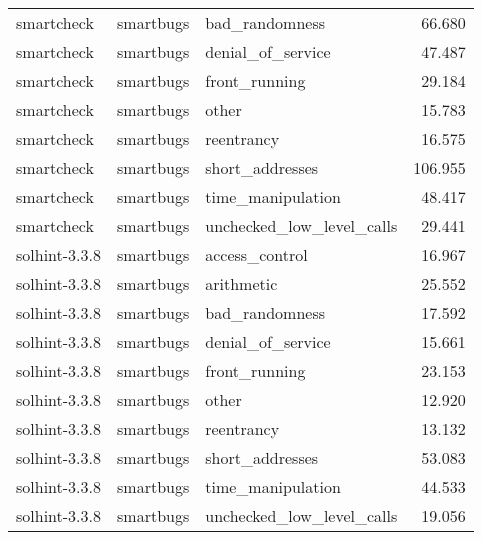 \begin{tabular}[t]{lllr}
smartcheck & smartbugs & bad\_randomness & 66.680\\
smartcheck & smartbugs & denial\_of\_service & 47.487\\
smartcheck & smartbugs & front\_running & 29.184\\
\addlinespace
smartcheck & smartbugs & other & 15.783\\
smartcheck & smartbugs & reentrancy & 16.575\\
smartcheck & smartbugs & short\_addresses & 106.955\\
smartcheck & smartbugs & time\_manipulation & 48.417\\
smartcheck & smartbugs & unchecked\_low\_level\_calls & 29.441\\
\addlinespace
solhint-3.3.8 & smartbugs & access\_control & 16.967\\
solhint-3.3.8 & smartbugs & arithmetic & 25.552\\
solhint-3.3.8 & smartbugs & bad\_randomness & 17.592\\
solhint-3.3.8 & smartbugs & denial\_of\_service & 15.661\\
solhint-3.3.8 & smartbugs & front\_running & 23.153\\
\addlinespace
solhint-3.3.8 & smartbugs & other & 12.920\\
solhint-3.3.8 & smartbugs & reentrancy & 13.132\\
solhint-3.3.8 & smartbugs & short\_addresses & 53.083\\
solhint-3.3.8 & smartbugs & time\_manipulation & 44.533\\
solhint-3.3.8 & smartbugs & unchecked\_low\_level\_calls & 19.056\\
\bottomrule
\end{tabular}
